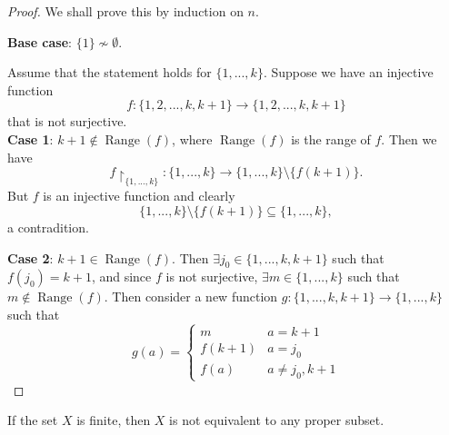 \documentclass[notoc,notitlepage]{tufte-book}
\DeclareMathOperator{\Range}{Range }
\begin{document}
\begin{proof}
  We shall prove this by induction on $n$.

  \noindent\textbf{Base case}: $\{1\} \nsim \emptyset$.

  \noindent Assume that the statement holds for $\{1, ..., k\}$. Suppose we have an injective function
  \begin{equation*}
    f : \{ 1, 2, ..., k, k + 1 \} \to \{ 1, 2, ..., k, k + 1 \}
  \end{equation*}
  that is not surjective. \\
  \noindent\textbf{Case 1}: $k + 1 \notin \Range(f)$, where $\Range(f)$ is the range of $f$. Then we have
  \begin{equation*}
    f \restriction_{\{1, ..., k\}} : \{1, ..., k \} \to \{1, ..., k\} \setminus \{ f(k + 1) \}.
  \end{equation*}
  But $f$ is an injective function and clearly
  \begin{equation*}
    \{1, ..., k \} \setminus \{ f(k + 1) \} \subseteq \{1, ..., k\},
  \end{equation*}
  a contradition.

  \noindent\textbf{Case 2}: $k + 1 \in \Range(f)$. Then $\exists j_0 \in \{1, ..., k, k + 1 \}$ such that $f(j_0) = k + 1$, and since $f$ is not surjective, $\exists m \in \{1, ..., k\}$ such that $m \notin \Range(f)$. Then consider a new function $g: \{1, ..., k, k + 1\} \to \{1, ..., k\}$ such that
  \begin{equation*}
    g(a) = \begin{cases}
      m        & a = k + 1 \\
      f(k + 1) & a = j_0 \\
      f(a)     & a \neq j_0, k + 1
    \end{cases}
  \end{equation*}
\end{proof}

\begin{crly}
\label{crly:pigeonhole_principle_finite_case}
  If the set $X$ is finite, then $X$ is not equivalent to any proper subset.
\end{crly}
\end{document}
